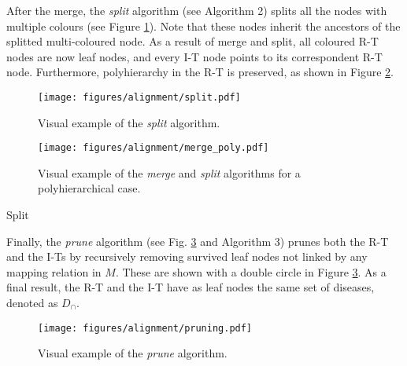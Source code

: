 \documentclass[journal,twoside,web]{ieeecolor}
\begin{document}
After the merge, the \textit{split} algorithm (see Algorithm 2) splits all the nodes with multiple colours (see Figure \ref{fig:split}). Note that these  nodes inherit the ancestors of the splitted multi-coloured node.  As a result of merge and split,  all coloured R-T nodes are now leaf nodes, and every I-T node points to its correspondent R-T node. Furthermore,  polyhierarchy in the R-T is preserved, as shown in  Figure \ref{fig:merge-split}.

\begin{figure}[ht!]
\centering
\texttt{[image: figures/alignment/split.pdf]}
\caption{Visual example of the  \textit{split} algorithm.}
\label{fig:split}
\end{figure}

\begin{figure}[ht!]
\centering
\texttt{[image: figures/alignment/merge\_poly.pdf]}
\caption{Visual example of the \textit{merge} and  \textit{split} algorithms for a polyhierarchical case.}
\label{fig:merge-split}
\end{figure}
\begin{algorithm}
\begin{footnotesize}
\SetAlgoLined

\label{algo:split}
\end{footnotesize}
\caption{Split}
\end{algorithm}

Finally, the \textit{prune} algorithm (see  Fig. 
\ref{fig:pruning} and Algorithm  %
3)  prunes both the R-T and the I-Ts by recursively removing survived  leaf nodes not linked by any mapping relation in $M$. These are shown with a double circle in Figure \ref{fig:pruning}.
As a final result, the R-T and the I-T have as leaf nodes the same set of  diseases, denoted as $D_{\cap}$. 



\begin{figure}[ht!]
\centering
\texttt{[image: figures/alignment/pruning.pdf]}
\caption{Visual example of the \textit{prune} algorithm.}
\label{fig:pruning}
\end{figure}
\end{document}
